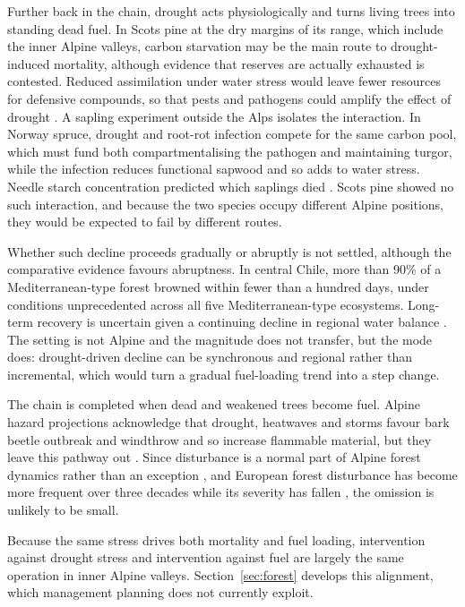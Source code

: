 \documentclass[11pt,a4paper]{article}
\begin{document}
Further back in the chain, drought acts physiologically and turns living trees into standing dead fuel. In Scots pine at the dry margins of its range, which include the inner Alpine valleys, carbon starvation may be the main route to drought-induced mortality, although evidence that reserves are actually exhausted is contested. Reduced assimilation under water stress would leave fewer resources for defensive compounds, so that pests and pathogens could amplify the effect of drought \citep{giuggiola_droughtinduced_2010}. A sapling experiment outside the Alps isolates the interaction. In Norway spruce, drought and root-rot infection compete for the same carbon pool, which must fund both compartmentalising the pathogen and maintaining turgor, while the infection reduces functional sapwood and so adds to water stress. Needle starch concentration predicted which saplings died \citep{gomezgallego_interaction_2022}. Scots pine showed no such interaction, and because the two species occupy different Alpine positions, they would be expected to fail by different routes.

Whether such decline proceeds gradually or abruptly is not settled, although the comparative evidence favours abruptness. In central Chile, more than 90\% of a Mediterranean-type forest browned within fewer than a hundred days, under conditions unprecedented across all five Mediterranean-type ecosystems. Long-term recovery is uncertain given a continuing decline in regional water balance \citep{miranda_widespread_2023}. The setting is not Alpine and the magnitude does not transfer, but the mode does: drought-driven decline can be synchronous and regional rather than incremental, which would turn a gradual fuel-loading trend into a step change.

The chain is completed when dead and weakened trees become fuel. Alpine hazard projections acknowledge that drought, heatwaves and storms favour bark beetle outbreak and windthrow and so increase flammable material, but they leave this pathway out \citep{gerberding_mapping_2025}. Since disturbance is a normal part of Alpine forest dynamics rather than an exception \citep{bebi_changes_2017}, and European forest disturbance has become more frequent over three decades while its severity has fallen \citep{senf_mapping_2021}, the omission is unlikely to be small.

Because the same stress drives both mortality and fuel loading, intervention against drought stress and intervention against fuel are largely the same operation in inner Alpine valleys. Section~\ref{sec:forest} develops this alignment, which management planning does not currently exploit.
\end{document}

